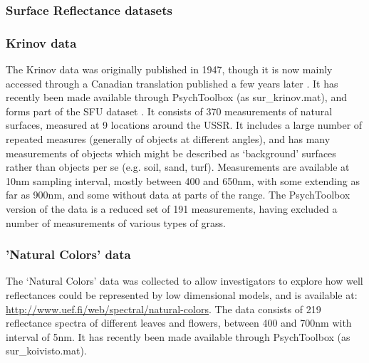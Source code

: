 
\subsubsection{Surface Reflectance datasets}

\subsubsection*{Krinov data \cite{%
krinov_spectral_1953}}
The Krinov data was originally published in 1947, though it is now mainly accessed through a Canadian translation published a few years later \cite{krinov_spectral_1953}. It has recently been made available through PsychToolbox \cite{brainard_psychophysics_1997} (as sur\_krinov.mat), and forms part of the SFU dataset \cite{barnard_data_2002}. It consists of 370 measurements of natural surfaces, measured at 9 locations around the USSR. It includes a large number of repeated measures (generally of objects at different angles), and has many measurements of objects which might be described as `background' surfaces rather than objects per se (e.g. soil, sand, turf). Measurements are available at 10nm sampling interval, mostly between 400 and 650nm, with some extending as far as 900nm, and some without data at parts of the range. The PsychToolbox version of the data is a reduced set of 191 measurements, having excluded a number of measurements of various types of grass. 

\subsubsection*{'Natural Colors' data \cite{parkkinen_spectral_1988}}
The `Natural Colors' data was collected to allow investigators to explore how well reflectances could be represented by low dimensional models, and is available at: \url{http://www.uef.fi/web/spectral/natural-colors}. The data consists of 219 reflectance spectra of different leaves and flowers, between 400 and 700nm with interval of 5nm. It has recently been made available through PsychToolbox (as sur\_koivisto.mat).

